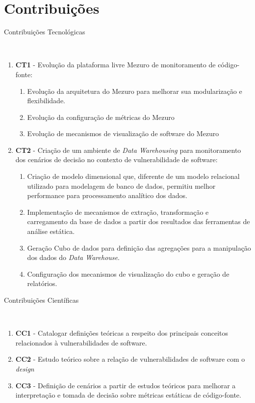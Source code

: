 \section{Contribuições}
%
\begin{description}
  \item [Contribuições Tecnológicas]\
\end{description}
    \begin{enumerate}
      \item \textbf{CT1} - Evolução da plataforma livre Mezuro de monitoramento de código-fonte:
        \begin{enumerate}
          \item Evolução da arquitetura do Mezuro para melhorar sua modularização e flexibilidade.
          \item Evolução da configuração de métricas do Mezuro
          \item Evolução de mecanismos de visualização de software do Mezuro
        \end{enumerate}
      \item \textbf{CT2} - Criação de um ambiente de \emph{Data Warehousing} para monitoramento dos cenários de decisão no contexto de vulnerabilidade de software:
            \begin{enumerate}
              \item Criação de modelo dimensional que, diferente de um modelo relacional utilizado para modelagem de banco de dados, permitiu melhor performance para processamento analítico dos dados.
              \item Implementação de mecanismos de extração, transformação e carregamento da base de dados a partir dos resultados das ferramentas de análise estática.
              \item Geração Cubo de dados para definição das agregações para a manipulação dos dados do \emph{Data Warehouse}.
          \item Configuração dos mecanismos de visualização do cubo e geração de relatórios.
            \end{enumerate}
    \end{enumerate}
\begin{description}
  \item [Contribuições Científicas]\
\end{description}
     \begin{enumerate}
      \item \textbf{CC1} - Catalogar definições teóricas a respeito dos principais conceitos relacionados à vulnerabilidades de software.
      \item \textbf{CC2} - Estudo teórico sobre a relação de vulnerabilidades de software com o \emph{design}
      \item \textbf{CC3} - Definição de cenários a partir de estudos teóricos para melhorar a interpretação e tomada de decisão sobre métricas estáticas de código-fonte.
     \end{enumerate}
